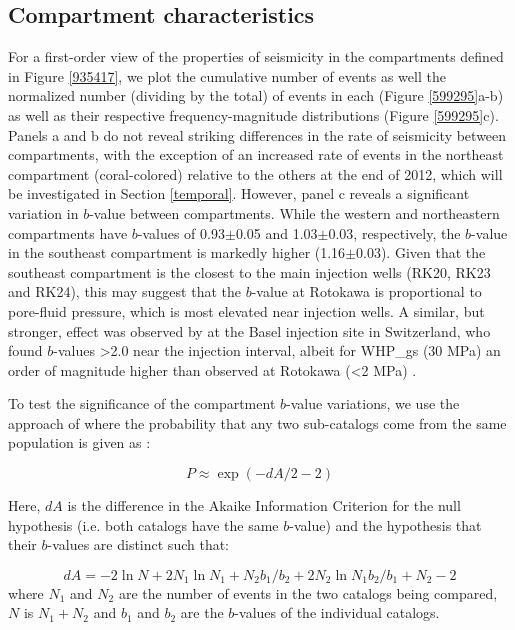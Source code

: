 \subsection{Compartment characteristics}
For a first-order view of the properties of seismicity in the compartments defined in Figure \ref{935417}, we plot the cumulative number of events as well the normalized number (dividing by the total) of events in each (Figure \ref{599295}a-b) as well as their respective frequency-magnitude distributions (Figure \ref{599295}c). Panels a and b do not reveal striking differences in the rate of seismicity between compartments, with the exception of an increased rate of events in the northeast compartment (coral-colored) relative to the others at the end of 2012, which will be investigated in Section \ref{temporal}. However, panel c reveals a significant variation in $b$-value between compartments. While the western and northeastern compartments have $b$-values of 0.93$\pm$0.05 and 1.03$\pm$0.03, respectively, the $b$-value in the southeast compartment is markedly higher (1.16$\pm$0.03). Given that the southeast compartment is the closest to the main injection wells (RK20, RK23 and RK24), this may suggest that the $b$-value at Rotokawa is proportional to pore-fluid pressure, which is most elevated near injection wells. A similar, but stronger, effect was observed by \citet{Bachmann_2012} at the Basel injection site in Switzerland, who found $b$-values \textgreater2.0 near the injection interval, albeit for \glspl{WHP_g} (30 MPa) an order of magnitude higher than observed at Rotokawa (\textless{2} MPa) \citep{haring2008characterisation}.

To test the significance of the compartment $b$-value variations, we use the approach of \citet{utsu1999representation} where the probability that any two sub-catalogs come from the same population is given as \cite{Wiemer_1998}:

\begin{equation}
    P\approx{}\exp(-dA/2 - 2)
\end{equation}

Here, $dA$ is the difference in the Akaike Information Criterion for the null hypothesis (i.e. both catalogs have the same $b$-value) and the hypothesis that their $b$-values are distinct such that:

\begin{equation}
    dA = -2\ln{N} + 2N_{1}\ln{N_{1} + N_{2}b_{1}/b_{2}} + 2N_{2}\ln{N_{1}b_{2}/b_{1} + N_{2}} - 2
\end{equation}
 where $N_{1}$ and $N_{2}$ are the number of events in the two catalogs being compared, $N$ is $N_{1} + N_{2}$ and $b_{1}$ and $b_{2}$ are the $b$-values of the individual catalogs.
 
